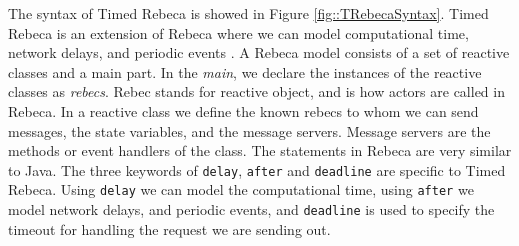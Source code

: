 The syntax of Timed Rebeca is showed in Figure \ref{fig::TRebecaSyntax}.
Timed Rebeca is an extension of Rebeca where we can model computational time, network delays, and periodic events \cite{DBLP:journals/scp/ReynissonSACJIS14,DBLP:conf/birthday/SirjaniK16}.
%
A Rebeca model consists of a set of reactive classes and a main part. In the \textit{main}, we declare the instances of the reactive classes as \textit{rebecs}. Rebec stands for reactive object, and is how actors are called in Rebeca. In a reactive class we define the known rebecs to whom we can send messages, the state variables, and the message servers. Message servers are the methods or event handlers of the class. The statements in Rebeca are very similar to Java.
The three keywords of \texttt{delay}, \texttt{after} and \texttt{deadline} are specific to Timed Rebeca.
Using \texttt{delay} we can model the computational time, using \texttt{after} we model network delays, and periodic events, and \texttt{deadline} is used to specify the timeout for handling the request we are sending out.


